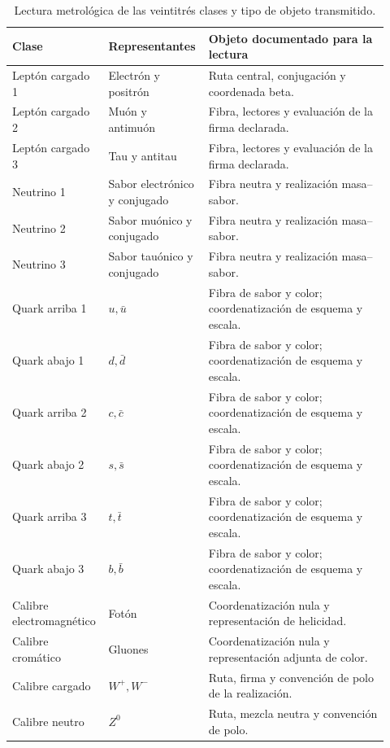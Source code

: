 \begingroup
\small
\setlength{\tabcolsep}{3pt}
\begin{table}[!htbp]
\centering\fontsize{9.2}{10.6}\selectfont\renewcommand{\arraystretch}{1.04}
\caption{Lectura metrológica de las veintitrés clases y tipo de objeto transmitido.}
\label{tab:vi-clases-metrologia}
\begin{tabular}{p{0.20\linewidth}p{0.25\linewidth}p{0.47\linewidth}}
\toprule
Clase & Representantes & Objeto documentado para la lectura\\
\midrule

Leptón cargado 1 & Electrón y positrón & Ruta central, conjugación y coordenada beta.\\
Leptón cargado 2 & Muón y antimuón & Fibra, lectores y evaluación de la firma declarada.\\
Leptón cargado 3 & Tau y antitau & Fibra, lectores y evaluación de la firma declarada.\\
Neutrino 1 & Sabor electrónico y conjugado & Fibra neutra y realización masa--sabor.\\
Neutrino 2 & Sabor muónico y conjugado & Fibra neutra y realización masa--sabor.\\
Neutrino 3 & Sabor tauónico y conjugado & Fibra neutra y realización masa--sabor.\\
Quark arriba 1 & \(u,\bar u\) & Fibra de sabor y color; coordenatización de esquema y escala.\\
Quark abajo 1 & \(d,\bar d\) & Fibra de sabor y color; coordenatización de esquema y escala.\\
Quark arriba 2 & \(c,\bar c\) & Fibra de sabor y color; coordenatización de esquema y escala.\\
Quark abajo 2 & \(s,\bar s\) & Fibra de sabor y color; coordenatización de esquema y escala.\\
Quark arriba 3 & \(t,\bar t\) & Fibra de sabor y color; coordenatización de esquema y escala.\\
Quark abajo 3 & \(b,\bar b\) & Fibra de sabor y color; coordenatización de esquema y escala.\\
Calibre electromagnético & Fotón & Coordenatización nula y representación de helicidad.\\
Calibre cromático & Gluones & Coordenatización nula y representación adjunta de color.\\
Calibre cargado & \(W^+,W^-\) & Ruta, firma y convención de polo de la realización.\\
Calibre neutro & \(Z^0\) & Ruta, mezcla neutra y convención de polo.\\

\end{tabular}
\end{table}
